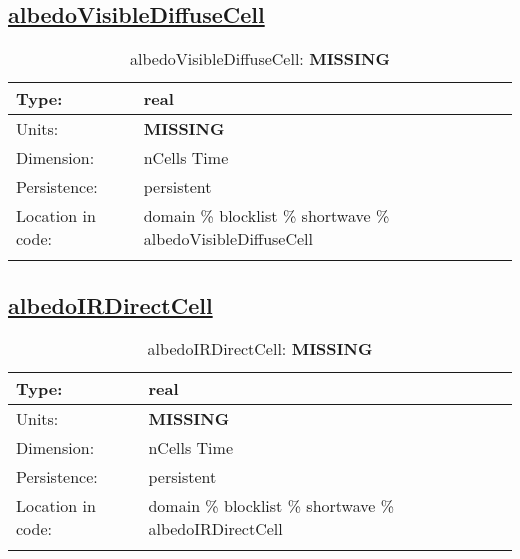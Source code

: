 \subsection[albedoVisibleDiffuseCell]{\hyperref[sec:var_tab_shortwave]{albedoVisibleDiffuseCell}}
\label{subsec:var_sec_shortwave_albedoVisibleDiffuseCell}
\begin{center}
\begin{longtable}{| p{2.0in} | p{4.0in} |}
        \hline 
        Type: & real \\
        \hline 
        Units: & {\bf \color{red} MISSING} \\
        \hline 
        Dimension: & nCells Time \\
        \hline 
        Persistence: & persistent \\
        \hline 
         Location in code: & domain \% blocklist \% shortwave \% albedoVisibleDiffuseCell \\
         \hline 
    \caption{albedoVisibleDiffuseCell: {\bf \color{red} MISSING}}
\end{longtable}
\end{center}
\subsection[albedoIRDirectCell]{\hyperref[sec:var_tab_shortwave]{albedoIRDirectCell}}
\label{subsec:var_sec_shortwave_albedoIRDirectCell}
\begin{center}
\begin{longtable}{| p{2.0in} | p{4.0in} |}
        \hline 
        Type: & real \\
        \hline 
        Units: & {\bf \color{red} MISSING} \\
        \hline 
        Dimension: & nCells Time \\
        \hline 
        Persistence: & persistent \\
        \hline 
         Location in code: & domain \% blocklist \% shortwave \% albedoIRDirectCell \\
         \hline 
    \caption{albedoIRDirectCell: {\bf \color{red} MISSING}}
\end{longtable}
\end{center}

